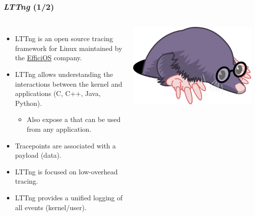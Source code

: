 \begin{frame}
  \frametitle{{\em LTTng} (1/2)}
  \begin{columns}
    \begin{itemize}
      \item LTTng is an open source tracing framework for Linux maintained by
            the \href{https://www.efficios.com/}{EfficiOS} company.
      \item LTTng allows understanding the interactions between the kernel and
            applications (C, C++, Java, Python).
      \begin{itemize}
        \item Also expose a  that can be used from any
              application.
      \end{itemize}
      \item Tracepoints are associated with a payload (data).
      \item LTTng is focused on low-overhead tracing.
      \item LTTng provides a unified logging of all events (kernel/user).
    \end{itemize}
    \includegraphics[height=0.3\textheight]{slides/debugging-system-wide-profiling/lttng-logo.jpg}
  \end{columns}
\end{frame}

